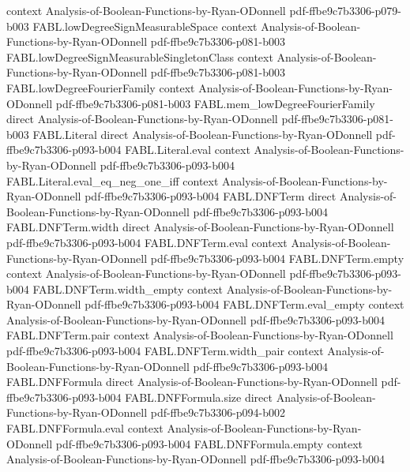 \begin{theorem}
  {context}
  {Analysis-of-Boolean-Functions-by-Ryan-ODonnell}
  {pdf-ffbe9c7b3306-p079-b003}
\proofstep
  {FABL.lowDegreeSignMeasurableSpace}
  {context}
  {Analysis-of-Boolean-Functions-by-Ryan-ODonnell}
  {pdf-ffbe9c7b3306-p081-b003}
\proofstep
  {FABL.lowDegreeSignMeasurableSingletonClass}
  {context}
  {Analysis-of-Boolean-Functions-by-Ryan-ODonnell}
  {pdf-ffbe9c7b3306-p081-b003}
\proofstep
  {FABL.lowDegreeFourierFamily}
  {context}
  {Analysis-of-Boolean-Functions-by-Ryan-ODonnell}
  {pdf-ffbe9c7b3306-p081-b003}
\proofstep
  {FABL.mem_lowDegreeFourierFamily}
  {direct}
  {Analysis-of-Boolean-Functions-by-Ryan-ODonnell}
  {pdf-ffbe9c7b3306-p081-b003}
\proofstep
  {FABL.Literal}
  {direct}
  {Analysis-of-Boolean-Functions-by-Ryan-ODonnell}
  {pdf-ffbe9c7b3306-p093-b004}
\proofstep
  {FABL.Literal.eval}
  {context}
  {Analysis-of-Boolean-Functions-by-Ryan-ODonnell}
  {pdf-ffbe9c7b3306-p093-b004}
\proofstep
  {FABL.Literal.eval_eq_neg_one_iff}
  {context}
  {Analysis-of-Boolean-Functions-by-Ryan-ODonnell}
  {pdf-ffbe9c7b3306-p093-b004}
\proofstep
  {FABL.DNFTerm}
  {direct}
  {Analysis-of-Boolean-Functions-by-Ryan-ODonnell}
  {pdf-ffbe9c7b3306-p093-b004}
\proofstep
  {FABL.DNFTerm.width}
  {direct}
  {Analysis-of-Boolean-Functions-by-Ryan-ODonnell}
  {pdf-ffbe9c7b3306-p093-b004}
\proofstep
  {FABL.DNFTerm.eval}
  {context}
  {Analysis-of-Boolean-Functions-by-Ryan-ODonnell}
  {pdf-ffbe9c7b3306-p093-b004}
\proofstep
  {FABL.DNFTerm.empty}
  {context}
  {Analysis-of-Boolean-Functions-by-Ryan-ODonnell}
  {pdf-ffbe9c7b3306-p093-b004}
\proofstep
  {FABL.DNFTerm.width_empty}
  {context}
  {Analysis-of-Boolean-Functions-by-Ryan-ODonnell}
  {pdf-ffbe9c7b3306-p093-b004}
\proofstep
  {FABL.DNFTerm.eval_empty}
  {context}
  {Analysis-of-Boolean-Functions-by-Ryan-ODonnell}
  {pdf-ffbe9c7b3306-p093-b004}
\proofstep
  {FABL.DNFTerm.pair}
  {context}
  {Analysis-of-Boolean-Functions-by-Ryan-ODonnell}
  {pdf-ffbe9c7b3306-p093-b004}
\proofstep
  {FABL.DNFTerm.width_pair}
  {context}
  {Analysis-of-Boolean-Functions-by-Ryan-ODonnell}
  {pdf-ffbe9c7b3306-p093-b004}
\proofstep
  {FABL.DNFFormula}
  {direct}
  {Analysis-of-Boolean-Functions-by-Ryan-ODonnell}
  {pdf-ffbe9c7b3306-p093-b004}
\proofstep
  {FABL.DNFFormula.size}
  {direct}
  {Analysis-of-Boolean-Functions-by-Ryan-ODonnell}
  {pdf-ffbe9c7b3306-p094-b002}
\proofstep
  {FABL.DNFFormula.eval}
  {context}
  {Analysis-of-Boolean-Functions-by-Ryan-ODonnell}
  {pdf-ffbe9c7b3306-p093-b004}
\proofstep
  {FABL.DNFFormula.empty}
  {context}
  {Analysis-of-Boolean-Functions-by-Ryan-ODonnell}
  {pdf-ffbe9c7b3306-p093-b004}

\end{theorem}
